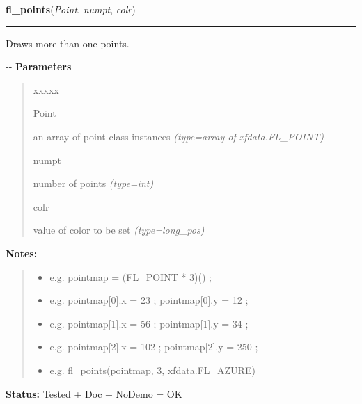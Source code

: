 \hspace{.8\funcindent}\begin{boxedminipage}{\funcwidth}

    \raggedright \textbf{fl\_points}(\textit{Point}, \textit{numpt}, \textit{colr})

    \vspace{-1.5ex}

    \rule{\textwidth}{0.5\fboxrule}
\setlength{\parskip}{2ex}

Draws more than one points.

-{}-
\setlength{\parskip}{1ex}
      \textbf{Parameters}
      \vspace{-1ex}

      \begin{quote}
        \begin{Ventry}{xxxxx}

          \item[Point]


an array of point class instances
            {\it (type=array of xfdata.FL\_POINT)}

          \item[numpt]


number of points
            {\it (type=int)}

          \item[colr]


value of color to be set
            {\it (type=long\_pos)}

        \end{Ventry}

      \end{quote}

\textbf{Notes:}
\begin{quote}
  \begin{itemize}

  \item
    \setlength{\parskip}{0.6ex}

e.g. pointmap = (FL\_POINT * 3)() ;


  \item 
e.g. pointmap{[}0{]}.x = 23 ; pointmap{[}0{]}.y = 12 ;


  \item 
e.g. pointmap{[}1{]}.x = 56 ; pointmap{[}1{]}.y = 34 ;


  \item 
e.g. pointmap{[}2{]}.x = 102 ; pointmap{[}2{]}.y = 250 ;


  \item 
e.g. fl\_points(pointmap, 3, xfdata.FL\_AZURE)


\end{itemize}

\end{quote}

\textbf{Status:} 
Tested + Doc + NoDemo = OK


    \end{boxedminipage}


